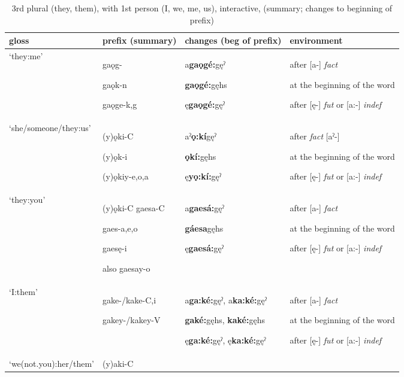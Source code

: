 \begin{table}
\caption{3rd plural (they, them), with 1st person (I, we, me, us), interactive, (summary; changes to beginning of prefix)}
\label{tab:1:3mpl1pron}
\tiny{
\begin{tabularx}{\textwidth}{XXXX}
\lsptoprule
gloss & prefix (summary) & changes (beg of prefix) & environment\\
\midrule
‘they:me’ & gaǫg-

gaǫk-n

gaǫge-k,g & a\textbf{gaǫgé:}gęˀ

\textbf{gaǫgé:}gęhs

ę\textbf{gaǫgé:}gęˀ & after [a-] \textit{fact}

at the beginning of the word 

after [ę-] \textit{fut} or [a:-] \textit{indef}\\
‘she/someone/they:us’ & (y)ǫki-C 

(y)ǫk-i 

(y)ǫkiy-e,o,a & aˀ\textbf{ǫ:kí}gęˀ

\textbf{ǫkí:}gęhs

ę\textbf{yǫ:kí:}gęˀ & after \textit{fact} [aˀ-] 

at the beginning of the word 

after [ę-] \textit{fut} or [a:-] \textit{indef}\\
‘they:you' & (y)ǫki-C gaesa-C

gaes-a,e,o

gaesę-i

also gaesay-o & a\textbf{gaesá:}gęˀ

\textbf{gáesa}gęhs

ę\textbf{gaesá:}gęˀ & after [a-] \textit{fact}

at the beginning of the word 

after [ę-] \textit{fut} or [a:-] \textit{indef}\\
‘I:them’ & gake-/kake-C,i

gakey-/kakey-V & a\textbf{ga:ké:}gęˀ, a\textbf{ka:ké:}gęˀ

\textbf{gaké:}gęhs,  \textbf{kaké:}gęhs

ę\textbf{ga:ké:}gęˀ, ę\textbf{ka:ké:}gęˀ & after [a-] \textit{fact}

at the beginning of the word 

after [ę-] \textit{fut} or [a:-] \textit{indef}\\
‘we(not.you):her/them’ & (y)aki-C


\end{tabularx}}
\end{table}
